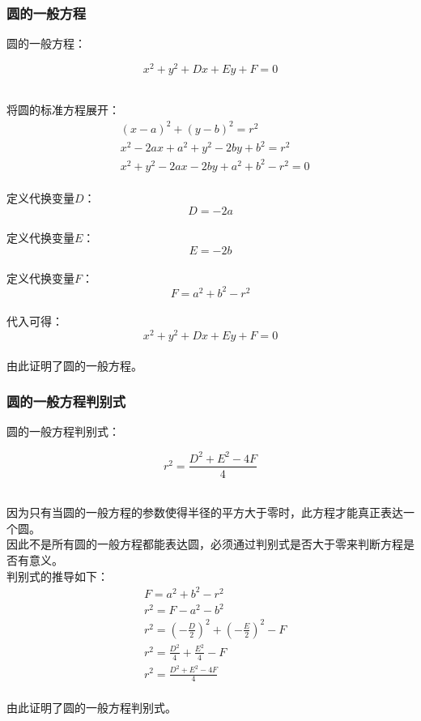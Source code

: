 \documentclass[UTF8]{ctexart}
\begin{document}
\subsubsection{圆的一般方程}
    圆的一般方程：
    \begin{large}
        \begin{equation*}
            x^2+y^2+Dx+Ey+F=0
        \end{equation*}
    \end{large}\\
    将圆的标准方程展开：
    \setcounter{equation}{0}
    \begin{align}
        &(x-a)^2+(y-b)^2=r^2\\[3mm]
        &x^2-2ax+a^2+y^2-2by+b^2=r^2\\[3mm]
        &x^2+y^2-2ax-2by+a^2+b^2-r^2=0
    \end{align}\\
    定义代换变量$D$：
    \begin{equation}
        D=-2a
    \end{equation}\\
    定义代换变量$E$：
    \begin{equation}
        E=-2b
    \end{equation}\\
    定义代换变量$F$：
    \begin{equation}
        F=a^2+b^2-r^2
    \end{equation}\\
    代入可得：
    \begin{equation}
        x^2+y^2+Dx+Ey+F=0
    \end{equation}\\
    由此证明了圆的一般方程。

\newpage

\subsubsection{圆的一般方程判别式}
    圆的一般方程判别式：
    \begin{large}
        \begin{equation*}
            r^2=\frac{D^2+E^2-4F}{4}
        \end{equation*}
    \end{large}\\
    因为只有当圆的一般方程的参数使得半径的平方大于零时，此方程才能真正表达一个圆。\\[3mm]
    因此不是所有圆的一般方程都能表达圆，必须通过判别式是否大于零来判断方程是否有意义。\\[3mm]
    判别式的推导如下：
    \setcounter{equation}{0}
    \begin{align}
        &F=a^2+b^2-r^2\\[4mm]
        &r^2=F-a^2-b^2\\[4mm]
        &r^2=\left(-\frac{D}{2}\right)^2+\left(-\frac{E}{2}\right)^2-F\\[4mm]
        &r^2=\frac{D^2}{4}+\frac{E^2}{4}-F\\[4mm]
        &r^2=\frac{D^2+E^2-4F}{4}
    \end{align}\\
    由此证明了圆的一般方程判别式。 
    
\end{document}
